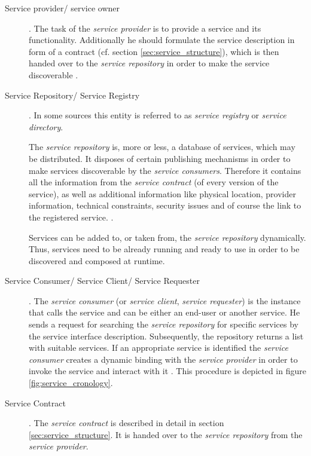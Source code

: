 \begin{description}
\item [Service provider/ service owner]. 
The task of the \emph{service provider} is to provide a service and its functionality. Additionally he should formulate the service description in form of a contract (cf. section \ref{sec:service_structure}), which is then handed over to the \emph{service repository} in order to make the service discoverable \cite{breivold}.

\item [Service Repository/ Service Registry].
In some sources this entity is referred to as \emph{service registry} or \emph{service directory}.

The \emph{service repository} is, more or less, a database of services, which may be distributed. It disposes of certain publishing mechanisms in order to make services discoverable by the \emph{service consumers}. Therefore it contains all the information from the \emph{service contract} (of every version of the service), as well as additional information like physical location, provider information, technical constraints, security issues and of course the link to the registered service. \cite[p.60-61]{krafzig} \cite{breivold} \cite{converge}.

Services can be added to, or taken from, the \emph{service repository} dynamically. Thus, services need to be already running and ready to use in order to be discovered and composed at runtime.

\item [Service Consumer/ Service Client/ Service Requester] .
The \emph{service consumer} (or \emph{service client}, \emph{service requester}) is the instance that calls the service and can be either an end-user or another service. He sends a request for searching the \emph{service repository} for specific services by the service interface description. Subsequently, the repository returns a list with suitable services. If an appropriate service is identified the \emph{service consumer} creates a dynamic binding with the \emph{service provider} in order to invoke the service and interact with it \cite{breivold} \cite{converge}. This procedure is depicted in figure \ref{fig:service_cronology}.

\item [Service Contract] .
The \emph{service contract} is described in detail in section \ref{sec:service_structure}. It is handed over to the \emph{service repository} from the \emph{service provider}.


\end{description}
